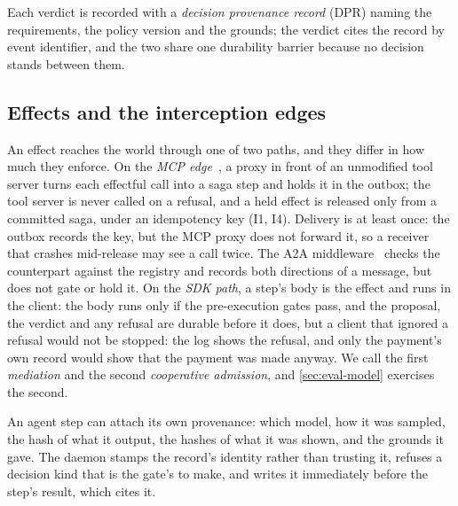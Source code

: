 Each verdict is recorded with a \emph{decision provenance record} (DPR) naming
the requirements, the policy version and the grounds; the verdict cites the
record by event identifier, and the two share one durability barrier because no
decision stands between them.

\subsection{Effects and the interception edges}
\label{sec:design-edges}
An effect reaches the world through one of two paths, and they differ in how
much they enforce. On the \emph{MCP edge}~\cite{mcp}, a proxy in front of an
unmodified tool server turns each effectful call into a saga step and holds it
in the outbox; the tool server is never called on a refusal, and a held effect
is released only from a committed saga, under an idempotency key (I1, I4).
Delivery is at least once: the outbox records the key, but the MCP proxy does
not forward it, so a receiver that crashes mid-release may see a call twice.
The A2A middleware~\cite{a2a} checks the counterpart against the registry and
records both directions of a message, but does not gate or hold it.
On the \emph{SDK path}, a step's body is the effect and runs in the client: the
body runs only if the pre-execution gates pass, and the proposal, the verdict
and any refusal are durable before it does, but a client that ignored a
refusal would not be stopped: the log shows the refusal, and only the payment's
own record would show that the payment was made anyway. We call the first
\emph{mediation} and the second \emph{cooperative admission}, and
\cref{sec:eval-model} exercises the second.

An agent step can attach its own provenance: which model, how it was sampled,
the hash of what it output, the hashes of what it was shown, and the grounds it
gave. The daemon stamps the record's identity rather than trusting it, refuses a
decision kind that is the gate's to make, and writes it immediately before the
step's result, which cites it.

